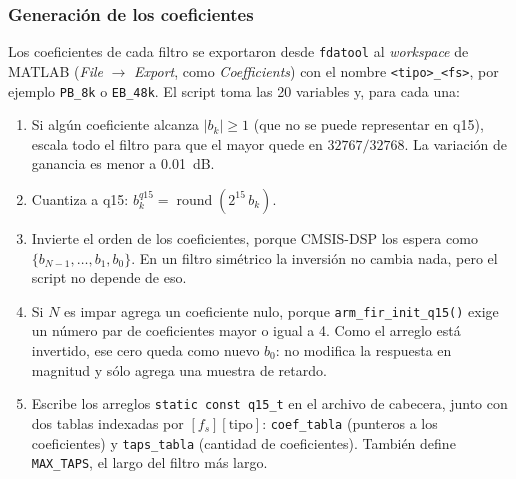 \documentclass[11pt,a4paper]{article}
\begin{document}




\subsubsection{Generación de los coeficientes}

Los coeficientes de cada filtro se exportaron desde \texttt{fdatool} al
\emph{workspace} de MATLAB (\emph{File} $\rightarrow$ \emph{Export},
como \emph{Coefficients}) con el nombre \texttt{<tipo>\_<fs>}, por ejemplo
\texttt{PB\_8k} o \texttt{EB\_48k}. El script 
toma las 20 variables y, para cada una:

\begin{enumerate}[nosep]
  \item Si algún coeficiente alcanza $|b_k| \ge 1$ (que no se puede
        representar en q15), escala todo el filtro para que el mayor quede en
        $32767/32768$. La variación de ganancia es menor a \qty{0.01}{\deci\bel}.
  \item Cuantiza a q15: $b_k^{q15} = \operatorname{round}\!\left(2^{15}\, b_k\right)$.
  \item Invierte el orden de los coeficientes, porque CMSIS-DSP los espera
        como $\{b_{N-1}, \dots, b_1, b_0\}$. En un filtro simétrico la
        inversión no cambia nada, pero el script no depende de eso.
  \item Si $N$ es impar agrega un coeficiente nulo, porque
        \texttt{arm\_fir\_init\_q15()} exige un número par de coeficientes
        mayor o igual a 4. Como el arreglo está invertido, ese cero queda
        como nuevo $b_0$: no modifica la respuesta en magnitud y sólo agrega
        una muestra de retardo.
  \item Escribe los arreglos \texttt{static const q15\_t} en el archivo de
        cabecera, junto con dos tablas indexadas por $[f_s][\text{tipo}]$:
        \texttt{coef\_tabla} (punteros a los coeficientes) y
        \texttt{taps\_tabla} (cantidad de coeficientes). También define
        \texttt{MAX\_TAPS}, el largo del filtro más largo.
\end{enumerate}
\end{document}
